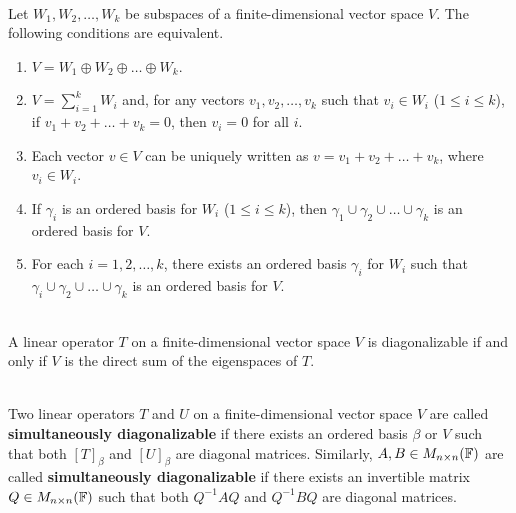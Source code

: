 \begin{theorem}
	\hfill\\
	Let $W_1, W_2, \dots, W_k$ be subspaces of a finite-dimensional vector space $V$. The following conditions are equivalent.

	\begin{enumerate}
		\item $V = W_1 \oplus W_2 \oplus \dots \oplus W_k$.
		\item $V = \displaystyle\sum_{i=1}^{k}W_i$ and, for any vectors $v_1, v_2, \dots, v_k$ such that $v_i \in W_i$ ($1 \leq i \leq k$), if $v_1 + v_2 + \dots + v_k = 0$, then $v_i = 0$ for all $i$.
		\item Each vector $v \in V$ can be uniquely written as $v = v_1 + v_2 + \dots + v_k$, where $v_i \in W_i$.
		\item If $\gamma_i$ is an ordered basis for $W_i$ ($1 \leq i \leq k$), then $\gamma_1 \cup \gamma_2 \cup \dots \cup \gamma_k$ is an ordered basis for $V$.
		\item For each $i = 1, 2, \dots, k$, there exists an ordered basis $\gamma_i$ for $W_i$ such that $\gamma_i \cup \gamma_2 \cup \dots \cup \gamma_k$ is an ordered basis for $V$.
	\end{enumerate}
\end{theorem}

\begin{theorem}
	\hfill\\
	A linear operator $T$ on a finite-dimensional vector space $V$ is diagonalizable if and only if $V$ is the direct sum of the eigenspaces of $T$.
\end{theorem}

\begin{definition}
	\hfill\\
	Two linear operators $T$ and $U$ on a finite-dimensional vector space $V$ are called \textbf{simultaneously diagonalizable} if there exists an ordered basis $\beta$ or $V$ such that both $[T]_\beta$ and $[U]_\beta$ are diagonal matrices. Similarly, $A, B \in M_{n \times n}(\mathbb{F})$ are called \textbf{simultaneously diagonalizable} if there exists an invertible matrix $Q \in M_{n \times n}(\mathbb{F})$ such that both $Q^{-1}AQ$ and $Q^{-1}BQ$ are diagonal matrices.
\end{definition}
